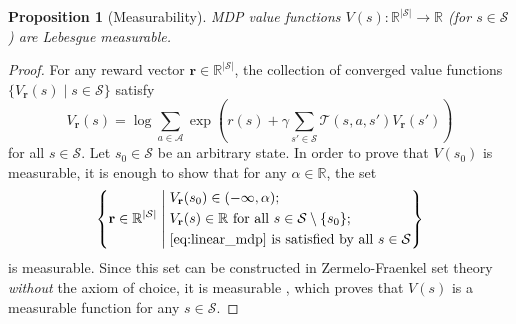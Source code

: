 \documentclass{mpaper}
\newtheorem{proposition}[theorem]{Proposition}
\newcommand{\V}{V_{\mathbf{r}}}
\begin{document}
\begin{proposition}[Measurability] \label{thm:measurability}
  MDP value functions $V(s) : \mathbb{R}^{|\mathcal{S}|} \to \mathbb{R}$ (for $s
  \in \mathcal{S}$) are Lebesgue measurable.
\end{proposition}
\begin{proof}
  For any reward vector $\mathbf{r} \in \mathbb{R}^{|\mathcal{S}|}$, the
  collection of converged value functions $\{ \V(s) \mid s \in
  \mathcal{S} \}$ satisfy
  \begin{equation} \label{eq:linear_mdp}
    \V(s) = \log \sum_{a \in \mathcal{A}}
    \exp\left( r(s) + \gamma\sum_{s' \in \mathcal{S}} \mathcal{T}(s, a,
      s')\V(s') \right)
  \end{equation}
  for all $s \in \mathcal{S}$. Let $s_0 \in \mathcal{S}$ be an arbitrary state.
  In order to prove that $V(s_0)$ is measurable, it is enough to show that for
  any $\alpha \in \mathbb{R}$, the set
  \[
    \left\{ \mathbf{r} \in \mathbb{R}^{|\mathcal{S}|} \; \middle|
    \begin{aligned}
      \;&\V(s_0) \in (-\infty, \alpha); \\
      \;&\V(s) \in \mathbb{R} \text{ for all } s \in \mathcal{S} \setminus \{ s_0 \}; \\
      \;&\text{\eqref{eq:linear_mdp} is satisfied by all } s \in
      \mathcal{S}
    \end{aligned}
    \right\}
  \]
  is measurable. Since this set can be constructed in Zermelo-Fraenkel set
  theory \emph{without} the axiom of choice, it is measurable
  \cite{herrlich2006axiom}, which proves that $V(s)$ is a measurable function
  for any $s \in \mathcal{S}$.
\end{proof}
\end{document}
